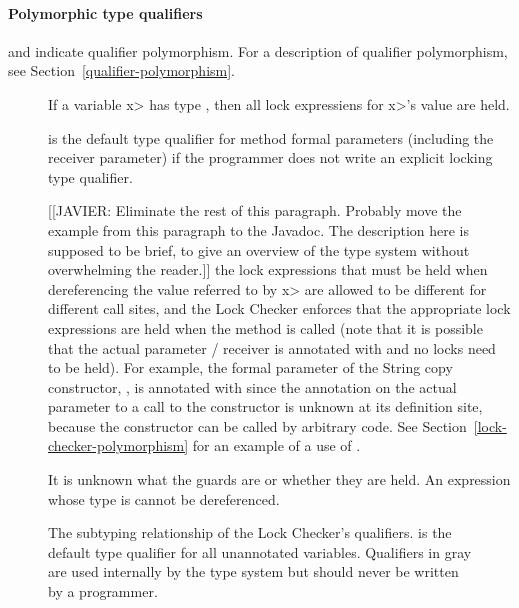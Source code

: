 \paragraph{Polymorphic type qualifiers}

and
indicate qualifier polymorphism.  For a description of qualifier
polymorphism, see Section~\ref{qualifier-polymorphism}.

\begin{description}

\item[]
  If a variable \<x> has type , then all 
  lock expressiens for \<x>'s value are held.

   is the default type qualifier for method
  formal parameters (including the receiver parameter)
  if the programmer does not
  write an explicit locking type qualifier.
  
[[JAVIER:  Eliminate the rest of this paragraph.  Probably move the example
    from this paragraph to the Javadoc.  The
    description here is supposed to be brief, to give an overview of the
    type system without overwhelming the reader.]]
  the lock expressions that must be held when
  dereferencing the value referred to by \<x> are allowed to be different
  for different call sites, and the Lock Checker
  enforces that the appropriate lock expressions are held when the method is called
  (note that it is possible that the actual parameter / receiver is annotated with
   and no locks need to be held).
  For example, the formal parameter of the String copy constructor,
  , is annotated with  since
  the  annotation
  on the actual parameter to a call to the constructor is unknown
  at its definition site, because the constructor can be called by
  arbitrary code.
  See Section~\ref{lock-checker-polymorphism}
  for an example of a use of .

\item[]
  It is unknown what the guards are or whether they are held.
  An expression whose type is 
  cannot be dereferenced.

\end{description}

\begin{figure}
\caption{The subtyping relationship of the Lock Checker's qualifiers.
 is the default type qualifier for all unannotated
variables.
Qualifiers in gray
are used internally by the type system but should never be written by a
programmer.}
\label{fig-lock-guardedby-hierarchy}
\end{figure}

